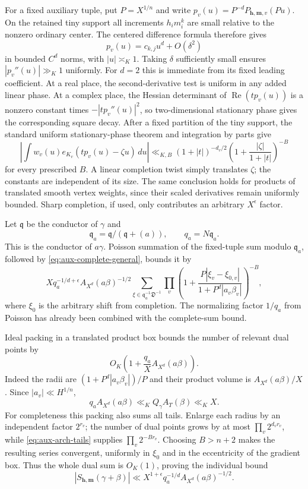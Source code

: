 \documentclass[11pt]{amsart}
\theoremstyle{definition}
\numberwithin{equation}{section}
\begin{document}
For a fixed auxiliary tuple, put $P=X^{1/n}$ and write
$p_v(u)=P^{-d}P_{\mathbf h,\mathbf m,v}(Pu)$.
On the retained tiny support all increments $h_im_i^k$ are small relative
to the nonzero ordinary center.  The centered difference formula therefore
gives
\[
 p_v(u)=c_{k,j}u^d+O(\delta^2)
\]
in bounded $C^d$ norms, with $|u|\asymp_K1$.  Taking $\delta$ sufficiently
small ensures $|p_v''(u)|\gg_K1$ uniformly.  For $d=2$ this is immediate
from its fixed leading coefficient.
At a real place, the second-derivative test is uniform in any added linear
phase.  At a complex place, the Hessian determinant of
$\operatorname{Re}(t p_v(u))$ is a nonzero constant times
$-|t p_v''(u)|^2$, so two-dimensional stationary phase gives the corresponding
square decay.  After a fixed partition of the tiny support, the standard
uniform stationary-phase theorem \cite[Section~7.7]{Hormander2003} and integration
by parts give
\begin{equation}\label{eq:aux-arch-tails}
 \left|\int w_v(u)e_{K_v}(t p_v(u)-\zeta u)\,du\right|
 \ll_{K,B}(1+|t|)^{-d_v/2}
       \left(1+\frac{|\zeta|}{1+|t|}\right)^{-B}
\end{equation}
for every prescribed $B$.  A linear completion twist simply translates
$\zeta$; the constants are independent of its size.  The same conclusion
holds for products of translated smooth vertex weights, since their
scaled derivatives remain uniformly bounded.  Sharp completion, if used,
only contributes an arbitrary $X^\epsilon$ factor.

Let $\mathfrak q$ be the conductor of $\gamma$ and
\[
 \mathfrak q_a=\mathfrak q/(\mathfrak q+(a)),\qquad q_a=N\mathfrak q_a.
\]
This is the conductor of $a\gamma$.
Poisson summation of the fixed-tuple sum modulo $\mathfrak q_a$, followed
by \eqref{eq:aux-complete-general}, bounds it by
\[
 Xq_a^{-1/d+\epsilon}A_{X^d}(a\beta)^{-1/2}
 \sum_{\xi\in\mathfrak q_a^{-1}\mathfrak D^{-1}}
 \prod_v\left(1+
   \frac{P|\xi_v-\xi_{0,v}|}{1+P^d|a_v\beta_v|}\right)^{-B},
\]
where $\xi_0$ is the arbitrary shift from completion.
The normalizing factor $1/q_a$ from Poisson has already been combined
with the complete-sum bound.

Ideal packing in a translated product box bounds the number of relevant
dual points by
\[
 O_K\left(1+\frac{q_a}{X}A_{X^d}(a\beta)\right).
\]
Indeed the radii are $(1+P^d|a_v\beta_v|)/P$ and their product volume is
$A_{X^d}(a\beta)/X$.  Since $|a_v|\ll H^{1/n}$,
\[
 q_aA_{X^d}(a\beta)\ll_K Q_\gamma A_T(\beta)\ll_KX.
\]
For completeness this packing also sums all tails.  Enlarge each radius
by an independent factor $2^{r_v}$; the number of dual points grows by at
most $\prod_v2^{d_vr_v}$, while \eqref{eq:aux-arch-tails} supplies
$\prod_v2^{-Br_v}$.  Choosing $B>n+2$ makes the resulting series convergent,
uniformly in $\xi_0$ and in the eccentricity of the gradient box.
Thus the whole dual sum is $O_K(1)$, proving the individual bound
\begin{equation}\label{eq:aux-fixed-tuple}
 |S_{\mathbf h,\mathbf m}(\gamma+\beta)|
 \ll X^{1+\epsilon}q_a^{-1/d}A_{X^d}(a\beta)^{-1/2}.
\end{equation}
\end{document}

